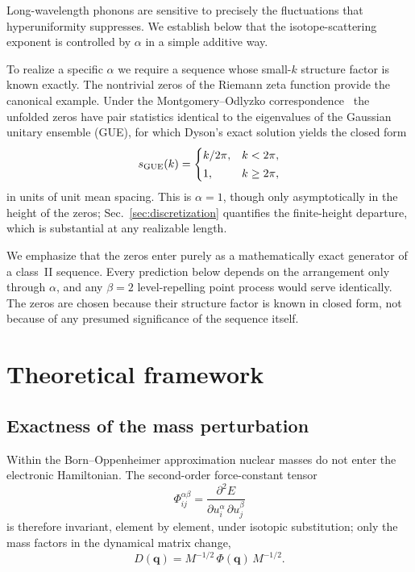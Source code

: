 \documentclass[
  aps,
  prl,
  reprint,
  amsmath,
  amssymb,
  superscriptaddress,
  floatfix,
  nofootinbib
]{revtex4-2}
\begin{document}
Long-wavelength phonons are sensitive to precisely the fluctuations that
hyperuniformity suppresses. We establish below that the isotope-scattering
exponent is controlled by $\alpha$ in a simple additive way.

To realize a specific $\alpha$ we require a sequence whose small-$k$ structure
factor is known exactly. The nontrivial zeros of the Riemann zeta function
provide the canonical example. Under the Montgomery--Odlyzko
correspondence~\cite{Montgomery1973,Odlyzko1987} the unfolded zeros have pair
statistics identical to the eigenvalues of the Gaussian unitary ensemble
(GUE), for which Dyson's exact solution yields the closed form
\begin{equation}
  s_{\rm GUE}(k)=
  \begin{cases}
    k/2\pi, & k<2\pi,\\[2pt]
    1,      & k\ge 2\pi,
  \end{cases}
  \label{eq:sgue}
\end{equation}
in units of unit mean spacing. This is $\alpha=1$, though only asymptotically in
the height of the zeros; Sec.~\ref{sec:discretization} quantifies the finite-height
departure, which is substantial at any realizable length.

We emphasize that the zeros enter purely as a mathematically exact generator
of a class~II sequence. Every prediction below depends on the arrangement only
through $\alpha$, and any $\beta=2$ level-repelling point process would serve
identically. The zeros are chosen because their structure factor is known in
closed form, not because of any presumed significance of the sequence itself.

\section{Theoretical framework}
\label{sec:theory}

\subsection{Exactness of the mass perturbation}

Within the Born--Oppenheimer approximation nuclear masses do not enter the
electronic Hamiltonian. The second-order force-constant tensor
\begin{equation}
  \Phi_{ij}^{\alpha\beta}
    = \frac{\partial^{2}E}{\partial u_i^\alpha\,\partial u_j^\beta}
  \label{eq:phi}
\end{equation}
is therefore invariant, element by element, under isotopic substitution; only
the mass factors in the dynamical matrix change,
\begin{equation}
  D(\bm q)=M^{-1/2}\,\Phi(\bm q)\,M^{-1/2}.
  \label{eq:dynmat}
\end{equation}
\end{document}
